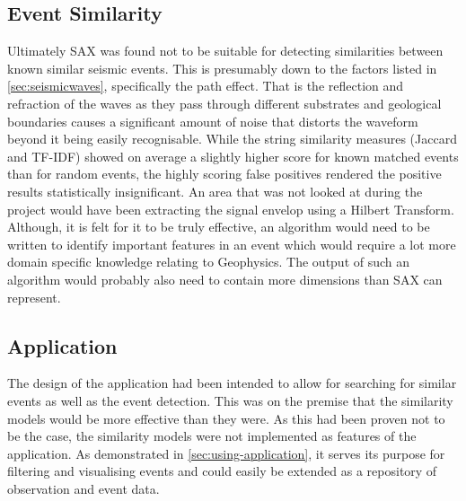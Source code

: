 \documentclass[../report.tex]{subfiles}
\begin{document}
\subsection{Event Similarity}

	Ultimately SAX was found not to be suitable for detecting similarities between known similar seismic events.  This is presumably down to the factors listed in \cref{sec:seismicwaves}, specifically the path effect.  That is the reflection and refraction of the waves as they pass through different substrates and geological boundaries causes a significant amount of noise that distorts the waveform beyond it being easily recognisable.  While the string similarity measures (Jaccard and TF-IDF) showed on average a slightly higher score for known matched events than for random events, the highly scoring false positives rendered the positive results statistically insignificant.  An area that was not looked at during the project would have been extracting the signal envelop using a Hilbert Transform.   Although, it is felt for it to be truly effective, an algorithm would need to be written to identify important features in an event which would require a lot more domain specific knowledge relating to Geophysics.  The output of such an algorithm would probably also need to contain more dimensions than SAX can represent.
	
\subsection{Application}

	The design of the application had been intended to allow for searching for similar events as well as the event detection.  This was on the premise that the similarity models would be more effective than they were.  As this had been proven not to be the case, the similarity models were not implemented as features of the application.  As demonstrated in \cref{sec:using-application}, it serves its purpose for filtering and visualising events and could easily be extended as a repository of observation and event data.
	
\end{document}
